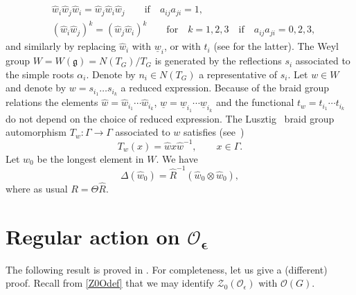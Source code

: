 \documentclass[pdftex]{sigma}
\numberwithin{equation}{section}
\theoremstyle{definition}
\newcommand{\e}{\epsilon}
\newcommand{\Oo}{{\mathcal O}}
\newcommand{\ra}{\rightarrow}
\begin{document}
\begin{align*}
&\hat{w}_i\hat{w}_j\hat{w}_i = \hat{w}_j\hat{w}_i\hat{w}_j\qquad \text{if}\quad a_{ij}a_{ji}=1,\\
& (\hat{w}_i\hat{w}_j)^k = (\hat{w}_j\hat{w}_i)^k \qquad \text{for}\quad k=1,2,3 \quad \text{if}\quad a_{ij}a_{ji}=0,2,3,
\end{align*}
and similarly by replacing $\hat{w}_i$ with $\underline{w}_i$, or with $t_i$ (see \cite{Soi} for the latter). The Weyl group $W=W(\mathfrak{g}) = N(T_G)/T_G$ is generated by the reflections $s_i$ associated to the simple roots $\alpha_i$. Denote by $n_i\in N(T_G)$ a representative of $s_i$. Let $w\in W$ and denote by $w=s_{i_1}\dots s_{i_k}$ a reduced expression. Because of the braid group relations the elements $\hat{w}=\hat{w}_{i_1}\cdots \hat{w}_{i_k}$, $\underline{w}=\underline{w}_{i_1}\cdots \underline{w}_{i_k}$ and the functional $t_w=t_{i_1}\cdots t_{i_k}$
do not depend on the choice of reduced expression. The Lusztig~\cite{Lusztig2} braid group automorphism $T_w \colon \Gamma \ra \Gamma$ associated to $w$ satisfies (see~\cite{DC-L})
\[T_w(x)=\hat{w}x\hat{w}^{-1}, \qquad x \in \Gamma.\]
Let $w_0$ be the longest element in $W$. We have
\begin{equation}\label{Deltaw}
\Delta(\hat{w}_0)=\hat{R}^{-1}(\hat{w}_0\otimes\hat{w}_0),
\end{equation}
where as usual $R={\Theta}{\hat R}$.

\section[Regular action on O\_e]{Regular action on $\boldsymbol{\Oo_\e}$}\label{actO}

The following result is proved in \cite[Section 1.10]{DC-L}. For completeness, let us give a (different) proof. Recall from \eqref{Z0Odef} that we may identify $\mathcal{Z}_0(\Oo_\e)$ with $\Oo(G)$.
\end{document}
